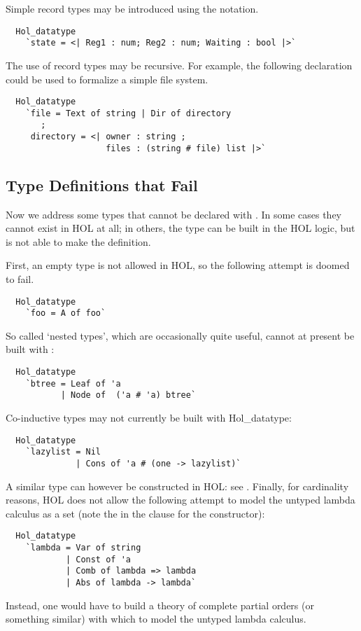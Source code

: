 %
Simple record types may be introduced using the  notation.
%
\begin{hol}
\begin{verbatim}
  Hol_datatype
    `state = <| Reg1 : num; Reg2 : num; Waiting : bool |>`
\end{verbatim}
\end{hol}
%
The use of record types may be recursive. For example, the following
declaration could be used to formalize a simple file system.
%
\begin{hol}
\begin{verbatim}
  Hol_datatype
    `file = Text of string | Dir of directory
       ;
     directory = <| owner : string ;
                    files : (string # file) list |>`
\end{verbatim}
\end{hol}

\subsection{Type Definitions that Fail}

 Now we address some types that cannot be declared with .
In some cases they cannot exist in HOL at all; in others, the type
can be built in the HOL logic, but  is not able to make
the definition.

First, an empty type is not allowed in HOL, so the following attempt
is doomed to fail.
%
\begin{hol}
\begin{verbatim}
  Hol_datatype
    `foo = A of foo`
\end{verbatim}
\end{hol}
%
So called `nested types', which are occasionally quite useful, cannot
at present be built with :
%
\begin{hol}
\begin{verbatim}
  Hol_datatype
    `btree = Leaf of 'a
           | Node of  ('a # 'a) btree`
\end{verbatim}
\end{hol}
%
Co-inductive types may not currently be built with {Hol\_datatype}:
%
\begin{hol}
\begin{verbatim}
  Hol_datatype
    `lazylist = Nil
              | Cons of 'a # (one -> lazylist)`
\end{verbatim}
\end{hol}
%
A similar type can however be constructed in HOL: see .
%
Finally, for cardinality reasons, HOL does not allow the following attempt
to model the untyped lambda calculus as a set (note
the \holtxt{->} in the clause for the  constructor):
%
\begin{hol}
\begin{verbatim}
  Hol_datatype
    `lambda = Var of string
            | Const of 'a
            | Comb of lambda => lambda
            | Abs of lambda -> lambda`
\end{verbatim}
\end{hol}
%
Instead, one would have to build a theory of complete partial orders
(or something similar) with which to model the untyped lambda calculus.

